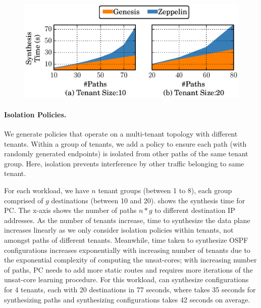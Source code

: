 

\begin{figure}
	\includegraphics[width=0.58\columnwidth]{figures/ospfisolation.eps}
	\vspace{-8pt}
\end{figure}
\paragraph{Isolation Policies.}
We generate policies that operate 
on a multi-tenant topology with 
 different tenants.
Within a  group of tenants, we add a policy to ensure
each path  (with randomly generated endpoints)
is isolated from other paths of the same tenant group.
Here, isolation  prevents interference by other traffic belonging to
same tenant.  
 
For each 
workload, we have $n$ tenant groups (between 1 to 8), 
each group comprised of $g$ destinations (between 10 and 20). 
shows the synthesis time 
for PC.
The x-axis shows the number of paths $n * g$ 
to different destination IP addresses. 
 As the number of tenants increase, time to 
synthesize the data plane increases linearly as we only 
consider isolation policies within tenants, not amongst paths 
of different tenants. Meanwhile, time taken to synthesize 
OSPF configurations increases exponentially with increasing 
number of tenants due to the exponential complexity of computing 
the unsat-cores; with increasing number of 
paths, PC needs to add more static routes 
and requires more iterations of the unsat-core learning
procedure. 
For this workload, \name can
synthesize configurations for 4 tenants, each with
20 destinations in 77 seconds, where \genesis takes 35 seconds
for synthesizing paths and synthesizing configurations
takes 42 seconds on average. 


